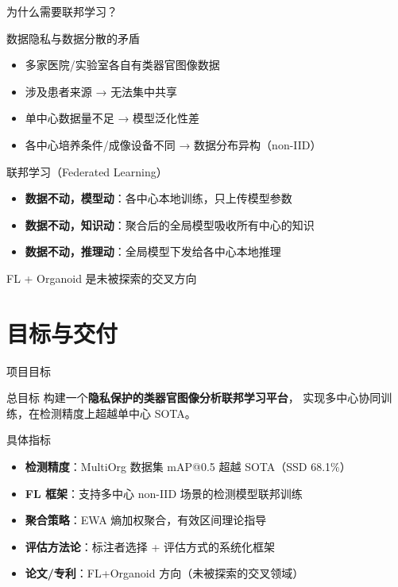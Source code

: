 \documentclass[aspectratio=169, 10pt]{beamer}
\begin{document}
\begin{frame}{为什么需要联邦学习？}
  \begin{block}{数据隐私与数据分散的矛盾}
    \begin{itemize}
      \item 多家医院/实验室各自有类器官图像数据
      \item 涉及患者来源 → \alert{无法集中共享}
      \item 单中心数据量不足 → 模型泛化性差
      \item 各中心培养条件/成像设备不同 → 数据分布异构（non-IID）
    \end{itemize}
  \end{block}
  \vspace{0em}
  \begin{block}{联邦学习（Federated Learning）}
    \begin{itemize}
      \item \textbf{数据不动，模型动}：各中心本地训练，只上传模型参数
      \item \textbf{数据不动，知识动}：聚合后的全局模型吸收所有中心的知识
      \item \textbf{数据不动，推理动}：全局模型下发给各中心本地推理
    \end{itemize}
  \end{block}
  \vspace{0em}
  \centering\alert{FL + Organoid 是未被探索的交叉方向}
\end{frame}

\section{目标与交付}

\begin{frame}{项目目标}
  \begin{block}{总目标}
    构建一个\textbf{隐私保护的类器官图像分析联邦学习平台}，
    实现多中心协同训练，在检测精度上超越单中心 SOTA。
  \end{block}
  \vspace{0.5em}
  \begin{block}{具体指标}
    \begin{itemize}
      \item[\textbf{R1}] \textbf{检测精度}：MultiOrg 数据集 mAP@0.5 超越 SOTA（SSD 68.1\%）
      \item[\textbf{R2}] \textbf{FL 框架}：支持多中心 non-IID 场景的检测模型联邦训练
      \item[\textbf{R3}] \textbf{聚合策略}：EWA 熵加权聚合，有效区间理论指导
      \item[\textbf{R4}] \textbf{评估方法论}：标注者选择 + 评估方式的系统化框架
      \item[\textbf{R5}] \textbf{论文/专利}：FL+Organoid 方向（未被探索的交叉领域）
    \end{itemize}
  \end{block}
\end{frame}
\end{document}
